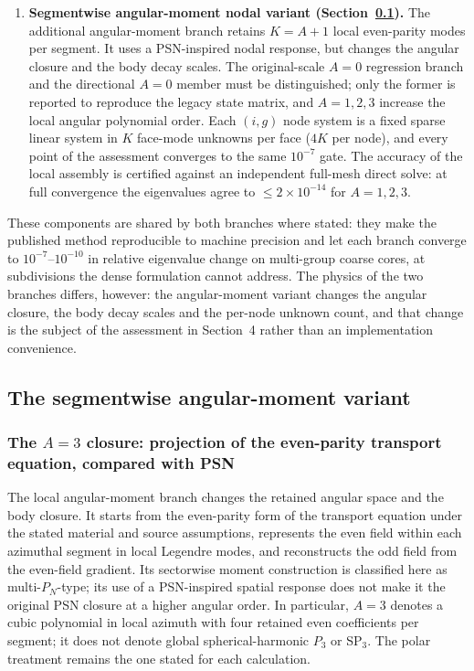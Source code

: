 \documentclass[11pt,a4paper]{article}
\begin{document}
\begin{enumerate}[label=\textbf{(\roman*)}, leftmargin=2.2em]
\item \textbf{Segmentwise angular-moment nodal variant
  (Section~\ref{sec:amvariant}).}
  The additional angular-moment branch retains $K{=}A{+}1$ local
  even-parity modes per segment. It uses a PSN-inspired nodal response,
  but changes the angular closure and the body decay scales. The
  original-scale $A{=}0$ regression branch and the directional $A{=}0$
  member must be distinguished; only the former is reported to
  reproduce the legacy state matrix, and $A{=}1,2,3$ increase the local
  angular polynomial order. Each $(i,g)$ node system is a fixed sparse
  linear system in $K$ face-mode unknowns per face ($4K$ per node), and
  every point of the assessment converges to the same $10^{-7}$ gate.
  The accuracy of the local assembly is certified against an
  independent full-mesh direct solve: at full convergence the
  eigenvalues agree to ${\le}2\times10^{-14}$ for $A{=}1,2,3$.
\end{enumerate}

These components are shared by both branches where stated: they make
the published method reproducible to machine precision and let each
branch converge to $10^{-7}$--$10^{-10}$ in relative eigenvalue change
on multi-group coarse cores, at subdivisions the dense formulation
cannot address. The physics of the two branches differs, however: the
angular-moment variant changes the angular closure, the body decay
scales and the per-node unknown count, and that change is the subject
of the assessment in Section~4 rather than an implementation
convenience.

\subsection{The segmentwise angular-moment variant}\label{sec:amvariant}

\subsubsection{The $A{=}3$ closure: projection of the even-parity
transport equation, compared with PSN}

The local angular-moment branch changes the retained angular space and
the body closure. It starts from the even-parity form of the transport
equation under the stated material and source assumptions, represents
the even field within each azimuthal segment in local Legendre modes,
and reconstructs the odd field from the even-field gradient. Its sectorwise
moment construction is classified here as multi-$P_N$-type; its use of a
PSN-inspired spatial response does not make it the original PSN closure
at a higher angular order. In particular, $A{=}3$ denotes a cubic
polynomial in local azimuth with four retained even coefficients per
segment; it does not denote global spherical-harmonic $P_3$ or
SP$_3$. The polar treatment remains the one stated for each calculation.
\end{document}
